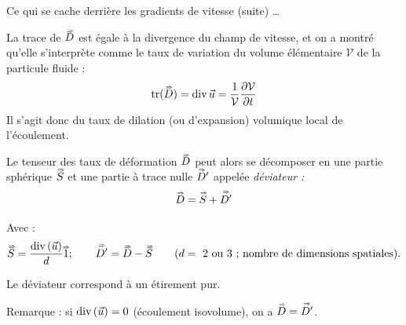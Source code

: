 \begin{frame}{Ce qui se cache derrière les gradients de vitesse (suite) \ldots}


\small

La trace de $\accentset{\Rightarrow}{D}$  est égale à la divergence du champ de vitesse,  et on a montré qu'elle s'interprète comme le taux de variation du volume élémentaire $\mathcal{V}$ de la particule fluide :
\[
	\mbox{tr}(\accentset{\Rightarrow}{D}) = \mbox{\rm div}\, \vec{u} = \frac{1}{\mathcal{V}} \displaystyle \frac{\partial \mathcal{V}}{\partial t}
\]
Il s'agit donc du \textcolor{vert}{taux de dilation} (ou d'expansion) volumique local de l'écoulement.






\pause


Le \textcolor{rouge}{tenseur des taux de déformation $\accentset{\Rightarrow}{D}$} 
 peut alors se décomposer
en une partie sphérique $\accentset{\Rightarrow}{S}$ et une partie à trace nulle $\accentset{\Rightarrow}{D}'$ appelée {\em déviateur :} 
\[
	\accentset{\Rightarrow}{D} = 
	\accentset{\Rightarrow}{S} + \accentset{\Rightarrow}{D'} 
\]

Avec : 
\[
\accentset{\Rightarrow}{S} = 
	\frac{\mbox{\rm div}\, (\vec{u})}{d} \accentset{\Rightarrow}{1} ; \qquad \accentset{\Rightarrow}{D'} = \accentset{\Rightarrow}{D}-\accentset{\Rightarrow}{S}  \qquad ( d  = \mbox{   2 ou 3 ; nombre de dimensions spatiales}).
\]	

%
%
%		




\pause
\bigskip
Le déviateur correspond à un \textcolor{rouge}{étirement pur}. 
 


\pause 
\smallskip
Remarque : si $\mbox{\rm div}\, (\vec{u}) = 0$ (écoulement isovolume), on a
$\accentset{\Rightarrow}{D} = \accentset{\Rightarrow}{D'}$.


\vspace{10mm}

\end{frame}




